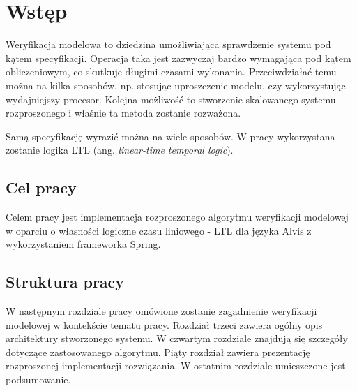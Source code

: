 \chapter{Wstęp}

Weryfikacja modelowa to dziedzina umożliwiająca sprawdzenie systemu pod kątem specyfikacji.
Operacja taka jest zazwyczaj bardzo wymagająca pod kątem obliczeniowym, co skutkuje długimi czasami wykonania. Przeciwdziałać temu można na kilka sposobów, np. stosując uproszczenie modelu, czy wykorzystując wydajniejszy procesor. Kolejna możliwość to stworzenie skalowanego systemu rozproszonego i właśnie ta metoda zostanie rozważona.

Samą specyfikację wyrazić można na wiele sposobów. W pracy wykorzystana zostanie logika LTL (ang. \textit{linear-time temporal logic}).


\section{Cel pracy}

Celem pracy jest implementacja rozproszonego algorytmu weryfikacji modelowej w oparciu o własności logiczne czasu liniowego - LTL dla języka Alvis z wykorzystaniem frameworka Spring.


\section{Struktura pracy}

W następnym rozdziale pracy omówione zostanie zagadnienie weryfikacji modelowej w kontekście tematu pracy.
Rozdział trzeci zawiera ogólny opis architektury stworzonego systemu.
W czwartym rozdziale znajdują się szczegóły dotyczące zastosowanego algorytmu.
Piąty rozdział zawiera prezentację rozproszonej implementacji rozwiązania.
W ostatnim rozdziale umieszczone jest podsumowanie.

